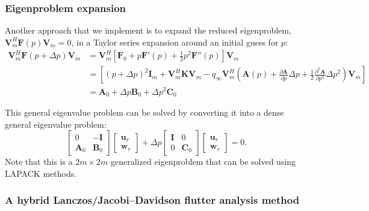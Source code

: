 \documentclass[12pt]{article}
\newcommand{\p}{\partial}
\newcommand{\f}{\frac}
\newcommand{\mb}{\mathbf}
\begin{document}
\subsubsection{Eigenproblem expansion}

Another approach that we implement is to expand the reduced
eigenproblem, $\mb{V}_{m}^{H} \mb{F}(p) \mb{V}_{m} = 0$, in a Taylor
series expansion around an initial guess for $p$:
%
\begin{equation*}
  \begin{aligned}
    \mb{V}_{m}^{H} \mb{F}(p + \Delta p) \mb{V}_{m} &
    = \mb{V}_{m}^{H} \left[ \mb{F}_{0} + p \mb{F}'(p) + \f{1}{2} p^2 \mb{F}''(p) \right] \mb{V}_{m} \\
    & = \left[ (p + \Delta p)^2 \mb{I}_{m} + \mb{V}_{m}^{H} \mb{K}\mb{V}_{m} - 
      q_{\infty} \mb{V}_{m}^{H} \left(\mb{A}(p) + 
      \f{\p \mb{A}}{\p p} \Delta p + 
      \f{1}{2} \f{\p^2\mb{A}}{\p p^2} \Delta p^2 \right) \mb{V}_{m} \right] \\
    & = \mb{A}_{0} + \Delta p \mb{B}_{0} + \Delta p^2 \mb{C}_{0}
  \end{aligned}
\end{equation*}

This general eigenvalue problem can be solved by converting it into a
dense general eigenvalue problem:
%
\begin{equation*}
  \begin{bmatrix}
    0 & -\mb{I} \\
    \mb{A}_{0} & \mb{B}_{0} 
  \end{bmatrix}
  \begin{bmatrix}
    \mb{u}_{r} \\ \mb{w}_{r}
  \end{bmatrix}
  + 
  \Delta p 
  \begin{bmatrix}
    \mb{I} & 0 \\
    0 & \mb{C}_{0}
  \end{bmatrix} 
  \begin{bmatrix}
    \mb{u}_{r} \\ \mb{w}_{r}
  \end{bmatrix}
  = 0.
\end{equation*}
Note that this is a $2m \times 2m$ generalized eigenproblem that can
be solved using LAPACK methods.

\subsubsection{A hybrid Lanczos/Jacobi--Davidson flutter analysis method}
\end{document}
